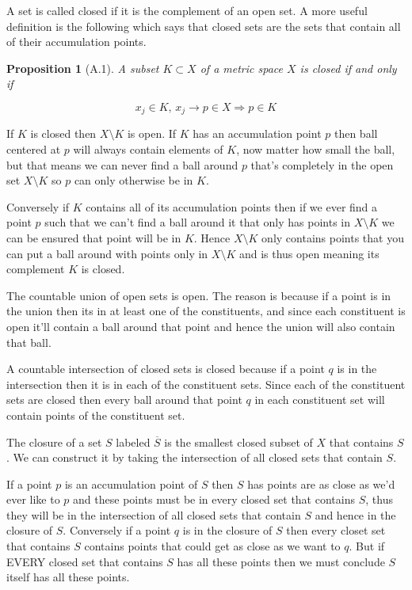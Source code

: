 \documentclass[oneside]{book}
\newtheorem{proposition}[theorem]{Proposition}
\newenvironment{proof}[1][Proof]{\begin{trivlist}
\item[\hskip \labelsep {\bfseries #1}]}{\end{trivlist}}
\begin{document}
A set is called closed if it is the complement of an open set. A more useful definition is the following which says that closed sets are the sets that contain all of their accumulation points. 

\begin{proposition}[A.1]
A subset $K \subset X$ of a metric space $X$ is closed if and only if

\begin{equation}
x_j \in K,\,x_j \to p \in X \Rightarrow p \in K
\end{equation}
\end{proposition}

\begin{proof}
If $K$ is closed then $X \setminus K$ is open. If $K$ has an accumulation point $p$ then ball centered at $p$ will always contain elements of $K$, now matter how small the ball, but that means we can never find a ball around $p$ that's completely in the open set $X \setminus K$ so $p$ can only otherwise be in $K$. 

Conversely if $K$ contains all of its accumulation points then if we ever find a point $p$ such that we can't find a ball around it that only has points in $X \setminus K$ we can be ensured that point will be in $K$. Hence $X \setminus K$ only contains points that you can put a ball around with points only in $X \setminus K$ and is thus open meaning its complement $K$ is closed.
\end{proof}

The countable union of open sets is open. The reason is because if a point is in the union then its in at least one of the constituents, and since each constituent is open it'll contain a ball around that point and hence the union will also contain that ball.

A countable intersection of closed sets is closed because if a point $q$ is in the intersection then it is in each of the constituent sets. Since each of the constituent sets are closed then every ball around that point $q$ in each constituent set will contain points of the constituent set. 

The closure of a set $S$ labeled $\overline{S}$ is the smallest closed subset of $X$ that contains $S$. We can construct it by taking the intersection of all closed sets that contain $S$.

If a point $p$ is an accumulation point of $S$ then $S$ has points are as close as we'd ever like to $p$ and these points must be in every closed set that contains $S$, thus they will be in the intersection of all closed sets that contain $S$ and hence in the closure of $S$. Conversely if a point $q$ is in the closure of $S$ then every closet set that contains $S$ contains points that could get as close as we want to $q$. But if EVERY closed set that contains $S$ has all these points then we must conclude $S$ itself has all these points. 
\end{document}
